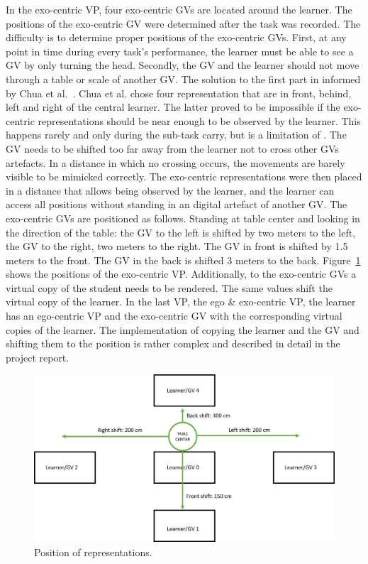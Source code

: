 In the exo-centric VP, four exo-centric GVs are located around the learner. The positions of the exo-centric GV were determined after the task was recorded. The difficulty is to determine proper positions of the exo-centric GVs. First, at any point in time during every task's performance, the learner must be able to see a GV by only turning the head. Secondly, the GV and the learner should not move through a table or scale of another GV. The solution to the first part in informed by Chua et al.~\cite{thaichichua}. Chua et al. chose four representation that are in front, behind, left and right of the central learner. The latter proved to be impossible if the exo-centric representations should be near enough to be observed by the learner. This happens rarely and only during the sub-task carry, but is a limitation of \exgo. The GV needs to be shifted too far away from the learner not to cross other GVs artefacts. In a distance in which no crossing occurs, the movements are barely visible to be mimicked correctly. The exo-centric representations were then placed in a distance that allows being observed by the learner, and the learner can access all positions without standing in an digital artefact of another GV. The exo-centric GVs are positioned as follows. Standing at table center and looking in the direction of the table: the GV to the left is shifted by two meters to the left, the GV to the right, two meters to the right. The GV in front is shifted by 1.5 meters to the front. The GV in the back is shifted 3 meters to the back. Figure~\ref{fig:multireppositions} shows the positions of the exo-centric VP. Additionally, to the exo-centric GVs a virtual copy of the student needs to be rendered. The same values shift the virtual copy of the learner. In the last VP, the ego \& exo-centric VP, the learner has an ego-centric VP and the exo-centric GV with the corresponding virtual copies of the learner. The implementation of copying the learner and the GV and shifting them to the position is rather complex and described in detail in the project report.\\
\begin{figure}[htb]
	\centering
	\includegraphics[width=\textwidth]{figures/positions.png}
	\caption[Positions of representations.]{Position of representations.}
	\label{fig:multireppositions}
\end{figure}
